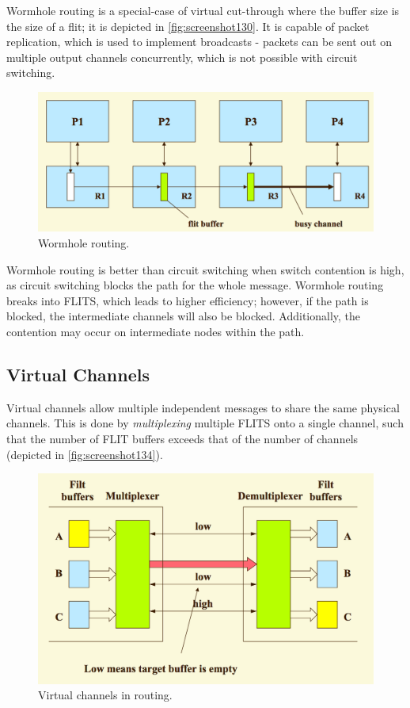 Wormhole routing is a special-case of virtual cut-through where the buffer size is the size of a flit; it is depicted in \autoref{fig:screenshot130}. It is capable of packet replication, which is used to implement broadcasts - packets can be sent out on multiple output channels concurrently, which is not possible with circuit switching.

\begin{figure}
\centering
\includegraphics[width=0.7\linewidth]{screenshot130}
\caption{Wormhole routing.}
\label{fig:screenshot130}
\end{figure}

Wormhole routing is better than circuit switching when switch contention is high, as circuit switching blocks the path for the whole message. Wormhole routing breaks into FLITS, which leads to higher efficiency; however, if the path is blocked, the intermediate channels will also be blocked. Additionally, the contention may occur on intermediate nodes within the path.

\subsection{Virtual Channels}
Virtual channels allow multiple independent messages to share the same physical channels. This is done by \textit{multiplexing} multiple FLITS onto a single channel, such that the number of FLIT buffers exceeds that of the number of channels (depicted in \autoref{fig:screenshot134}).

\begin{figure}
\centering
\includegraphics[width=0.7\linewidth]{screenshot134}
\caption{Virtual channels in routing.}
\label{fig:screenshot134}
\end{figure}

